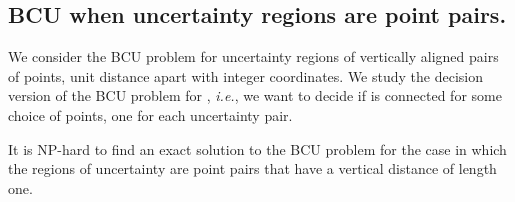 \subsection{BCU when uncertainty regions are point pairs.}
\label{sec:point-pairs}

We consider the BCU problem for uncertainty regions of vertically aligned pairs of points, unit distance apart with integer coordinates.
We study the decision version of the BCU problem for , {\em i.e.}, we want to decide if  is connected for some choice of points, one for each uncertainty pair.
\begin{theorem}\label{theorem1} It is NP-hard to find an exact solution to the BCU problem for the case in which the regions of uncertainty are point pairs
that have a vertical distance of length one.
\end{theorem}


